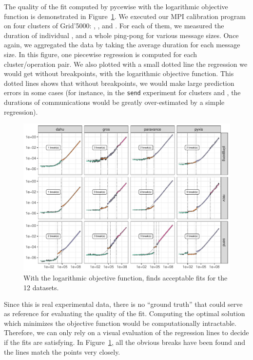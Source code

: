                 The quality of the fit computed by pycewise with the logarithmic objective function is demonstrated in
                Figure~\ref{fig:prediction:pycewise_demo}. We executed our MPI calibration program on four clusters of
                Grid'5000: \dahu, \gros, \paravance and \pyxis. For each of them, we measured the duration of individual
                \recv, \send and a whole ping-pong for various message sizes. Once again, we aggregated the data by
                taking the average duration for each message size. In this figure, one piecewise regression is computed
                for each cluster/operation pair. We also plotted with a small dotted line the regression we would get
                without breakpoints, with the logarithmic objective function. This dotted lines shows that without
                breakpoints, we would make large prediction errors in some cases (for instance, in the \texttt{send}
                experiment for clusters \gros and \paravance, the durations of  communications would
                be greatly over-estimated by a simple regression).

                \begin{figure}[htpb]
                    \centering
                    \includegraphics[width=\linewidth]{img/prediction/modeling/network/pycewise_demo.pdf}
                    \caption{With the logarithmic objective function, \pyce finds acceptable fits for the 12 datasets.}%
                    \label{fig:prediction:pycewise_demo}
                \end{figure}

                Since this is real experimental data, there is no ``ground truth'' that could serve as reference for
                evaluating the quality of the fit. Computing the optimal solution which minimizes the objective function
                would be computationally intractable. Therefore, we can only rely on a visual evaluation of the
                regression lines to decide if the fits are satisfying. In Figure~\ref{fig:prediction:pycewise_demo}, all
                the obvious breaks have been found and the lines match the points very closely.

